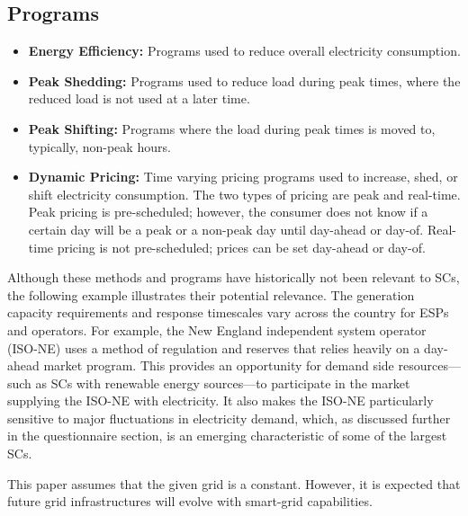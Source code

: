 \subsection{Programs}
\begin{itemize}
\item {\bf Energy Efficiency:}  Programs used to reduce overall electricity consumption.

\item {\bf Peak Shedding:}  Programs used to reduce load during peak times, 
where the reduced load is not used at a later time. 

\item {\bf Peak Shifting:}  Programs where the load during peak times is moved to, typically, non-peak hours. 

\item {\bf Dynamic Pricing:}  Time varying pricing programs used to increase, shed,
 or shift electricity consumption. 
The two types of pricing are peak and real-time.  Peak pricing is pre-scheduled; however, the consumer 
does not know if a certain day will be a peak or a non-peak day until day-ahead or day-of.  
Real-time pricing is not pre-scheduled; prices can be set day-ahead or day-of.
\end{itemize}

Although these methods and programs have historically not been relevant to SCs,
the following example illustrates their potential relevance.
The generation capacity requirements and response timescales vary across the country for ESPs and operators. For example, the New England independent system operator (ISO-NE) uses a method 
of regulation and reserves that relies heavily on a day-ahead market program. This provides an opportunity 
for demand side resources---such as SCs with renewable energy sources---to participate in the 
market supplying the ISO-NE with electricity. It also makes the ISO-NE particularly sensitive to major 
fluctuations in electricity demand, which, as discussed further in the questionnaire section, is an emerging 
characteristic of some of the largest SCs.%

This paper assumes that the given grid is a constant. However, it is expected 
that future grid infrastructures will 
evolve with smart-grid capabilities. 
